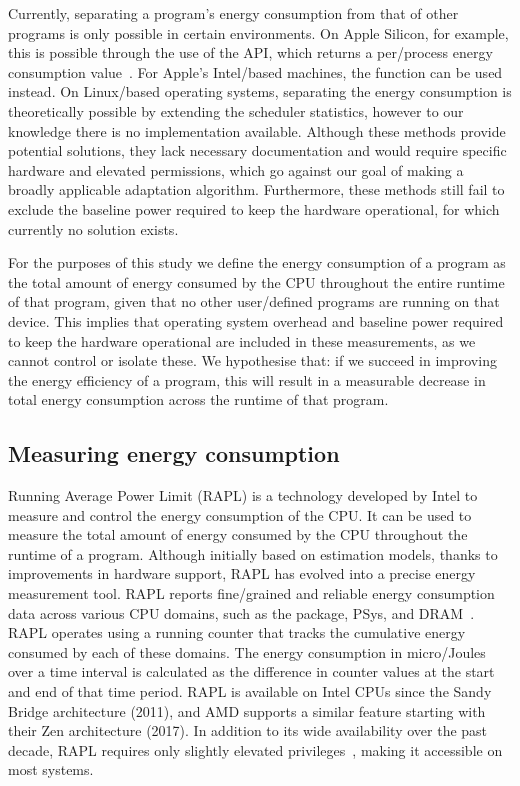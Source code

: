 Currently, separating a program's energy consumption from that of other programs is only possible in certain environments.
On Apple Silicon, for example, this is possible through the use of the  API, which returns a per\-/process energy consumption value~\cite{queze2023power}.
For Apple's Intel\-/based machines, the  function can be used instead.
On Linux\-/based operating systems, separating the energy consumption is theoretically possible by extending the scheduler statistics, however to our knowledge there is no implementation available.
Although these methods provide potential solutions, they lack necessary documentation and would require specific hardware and elevated permissions, which go against our goal of making a broadly applicable adaptation algorithm.
Furthermore, these methods still fail to exclude the baseline power required to keep the hardware operational, for which currently no solution exists.

For the purposes of this study we define the energy consumption of a program as the total amount of energy consumed by the CPU throughout the entire runtime of that program, given that no other user\-/defined programs are running on that device.
This implies that operating system overhead and baseline power required to keep the hardware operational are included in these measurements, as we cannot control or isolate these.
We hypothesise that: if we succeed in improving the energy efficiency of a program, this will result in a measurable decrease in total energy consumption across the runtime of that program.

\subsection{Measuring energy consumption}
Running Average Power Limit (RAPL) is a technology developed by Intel to measure and control the energy consumption of the CPU.
It can be used to measure the total amount of energy consumed by the CPU throughout the runtime of a program.
Although initially based on estimation models, thanks to improvements in hardware support, RAPL has evolved into a precise energy measurement tool.
RAPL reports fine\-/grained and reliable energy consumption data across various CPU domains, such as the package, PSys, and DRAM~\cite{khan2018rapl}.
RAPL operates using a running counter that tracks the cumulative energy consumed by each of these domains.
The energy consumption in micro\-/Joules over a time interval is calculated as the difference in counter values at the start and end of that time period.
RAPL is available on Intel CPUs since the Sandy Bridge architecture (2011), and AMD supports a similar feature starting with their Zen architecture (2017).
In addition to its wide availability over the past decade, RAPL requires only slightly elevated privileges~\cite{zhang2021red}, making it accessible on most systems.

